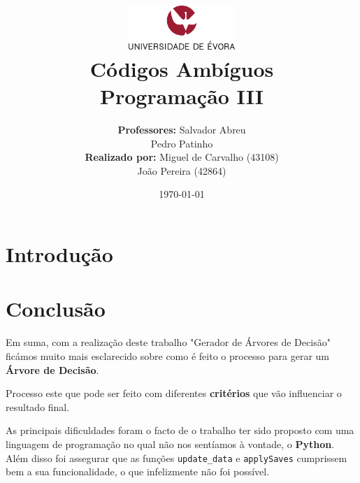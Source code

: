 \documentclass[11pt]{article}   %
\title
{
    \includegraphics[width=0.3\textwidth]{images/logo_universidade.png}
    \\[0.1cm]
    \textbf{Códigos Ambíguos} \\
    Programação III
}
\author
{
    \textbf{Professores:} Salvador Abreu \\ Pedro Patinho \\
    \textbf{Realizado por:} Miguel de Carvalho (43108) \\ João Pereira (42864) 
}
\date{\today}
\begin{document}
\maketitle

\section{Introdução} 


\section{Conclusão} %
\hspace{0,5cm}Em suma, com a realização deste trabalho "Gerador de Árvores de Decisão" ficámos muito mais esclarecido sobre como é
feito o processo para gerar um \textbf{Árvore de Decisão}. \par
Processo este que pode ser feito com diferentes \textbf{critérios} que vão influenciar o resultado final.

As principais dificuldades foram o facto de o trabalho ter sido proposto com uma linguagem de programação no qual não nos
sentíamos à vontade, o \textbf{Python}.
Além disso foi assegurar que as funções \verb|update_data| e \verb|applySaves| cumprissem bem a sua funcionalidade, o que infelizmente não
foi possível.
\end{document}
